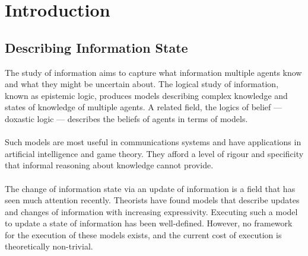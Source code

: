 \documentclass[12pt, a4paper, twoside]{article}
\begin{document}

\tableofcontents

\vfill
\pagebreak


\section{Introduction}\label{intro}
\subsection{Describing Information State}\label{intro_infoState}
The study of information aims to capture what information multiple agents know
and what they might be uncertain about.
The logical study of information, known as epistemic logic, produces models
describing complex knowledge and states of knowledge of multiple agents.
A related field, the logics of belief --- doxastic logic --- describes the
beliefs of agents in terms of models.\\
\\
Such models are most useful in communications systems and have applications in
artificial intelligence and game theory.
They afford a level of rigour and specificity that informal reasoning about
knowledge cannot provide.\\
\\
The change of information state via an update of information is a field that has
seen much attention recently.
Theorists have found models that describe updates and changes of information with
increasing expressivity.
Executing such a model to update a state of information has been well-defined.
However, no framework for the execution of these models exists, and the current
cost of execution is theoretically non-trivial.
\end{document}
